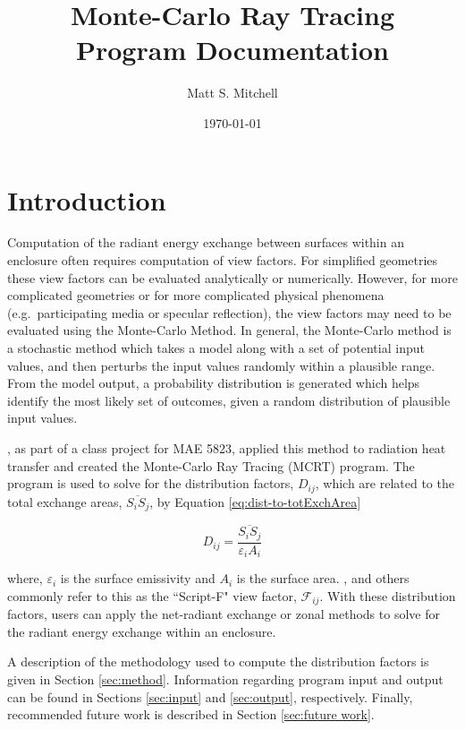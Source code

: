\documentclass{article}
\title{\textbf{Monte-Carlo Ray Tracing} \\ Program Documentation}
\date{\today}
\author{Matt S. Mitchell}
\begin{document}
\maketitle
\clearpage
\tableofcontents
\clearpage

\section{Introduction}

Computation of the radiant energy exchange between surfaces within an enclosure often requires computation of view factors. For simplified geometries these view factors can be evaluated analytically or numerically. However, for more complicated geometries or for more complicated physical phenomena (e.g.~participating media or specular reflection), the view factors may need to be evaluated using the Monte-Carlo Method. In general, the Monte-Carlo method is a stochastic method which takes a model along with a set of potential input values, and then perturbs the input values randomly within a plausible range. From the model output, a probability distribution is generated which helps identify the most likely set of outcomes, given a random distribution of plausible input values.

\cite{Nigusse2004}, as part of a class project for MAE 5823, applied this method to radiation heat transfer and created the Monte-Carlo Ray Tracing (MCRT) program. The program is used to solve for the distribution factors, $D_{ij}$, which are related to the total exchange areas, $\overline{S_i S_j}$, by Equation \ref{eq:dist-to-totExchArea}

\begin{equation}
    D_{ij} = \frac{\overline{S_i S_j}}{\varepsilon_i A_i}
    \label{eq:dist-to-totExchArea}
\end{equation}

where, $\varepsilon_i$ is the surface emissivity and $A_i$ is the surface area. \cite{Modest2003}, and others commonly refer to this as the ``Script-F" view factor, $\mathscr{F}_{ij}$. With these distribution factors, users can apply the net-radiant exchange or zonal methods to solve for the radiant energy exchange within an enclosure.

A description of the methodology used to compute the distribution factors is given in Section \ref{sec:method}. Information regarding program input and output can be found in Sections \ref{sec:input} and \ref{sec:output}, respectively. Finally, recommended future work is described in Section \ref{sec:future work}.
\end{document}
